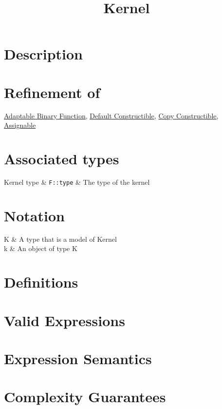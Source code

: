 \documentclass{article}
\begin{document}
\title{Kernel}
\maketitle


\section*{Description}
\section*{Refinement of}

\href{http://www.sgi.com/tech/stl/AdaptableBinaryFunction.html}{Adaptable Binary Function}, 
\href{http://www.sgi.com/tech/stl/DefaultConstructible.html}{Default Constructible}, 
\href{http://www.boost.org/doc/html/CopyConstructible.html}{Copy Constructible},
\href{http://www.sgi.com/tech/stl/Assignable.html}{Assignable}

\section*{Associated types}

\begin{tabular}
Kernel type & \texttt{F::type} & The type of the kernel \\
\end{tabular}

\section*{Notation}
\begin{tabular}
K & A type that is a model of Kernel \\
k & An object of type K \\
\end{tabular}

\section*{Definitions}
\section*{Valid Expressions}
\section*{Expression Semantics}

\section*{Complexity Guarantees}
\end{document}
